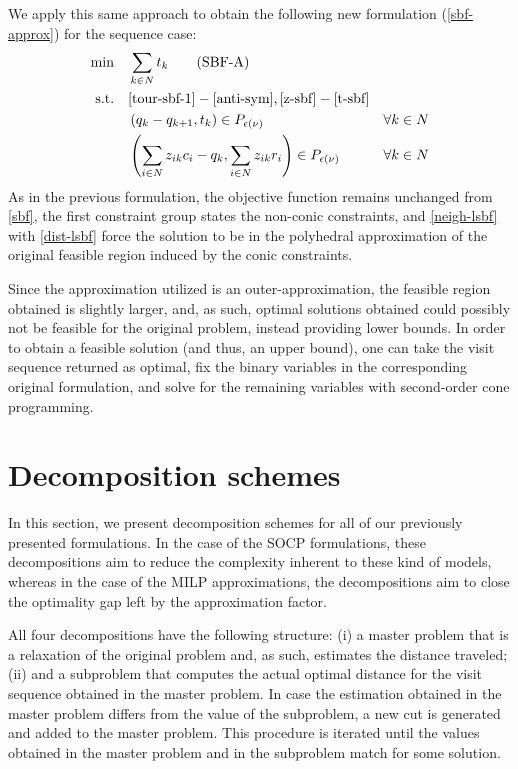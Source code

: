 \documentclass[pdflatex,sn-mathphys-num]{sn-jnl}%
\begin{document}
We apply this same approach to obtain the following new formulation (\ref{sbf-approx}) for the sequence case:
\begin{subequations}
\begin{align}
\min &&& \sum_{k \in N} t_k \tag{SBF-A} \label{sbf-approx}\\
\text{s.t.} &&& \eqref{tour-sbf-1}-\eqref{anti-sym}, \eqref{z-sbf}-\eqref{t-sbf}& \nonumber \\
&&& \left(q_k - q_{k+1}, t_k\right) \in P_{\epsilon(\nu)} & \forall k \in N \label{neigh-lsbf}\\
&&& \left(\sum_{i \in N} {z}_{ik}  c_i - q_k, \sum_{i\in N} {z}_{ik}  r_i\right) \in P_{\epsilon(\nu)} & \forall k \in N \label{dist-lsbf}
\end{align}
\end{subequations}
As in the previous formulation, the objective function remains unchanged from \ref{sbf}, the first constraint group states the non-conic constraints, and \eqref{neigh-lsbf} with \eqref{dist-lsbf} force the solution to be in the polyhedral approximation of the original feasible region induced by the conic constraints.

Since the approximation utilized is an outer-approximation, the feasible region obtained is slightly larger, and, as such, optimal solutions obtained could possibly not be feasible for the original problem, instead providing lower bounds. In order to obtain a feasible solution (and thus, an upper bound), one can take the visit sequence returned as optimal, fix the binary variables in the corresponding original formulation, and solve for the remaining variables with second-order cone programming.

\section{Decomposition schemes}\label{sec5}

In this section, we present decomposition schemes for all of our previously presented formulations. In the case of the SOCP formulations, these decompositions aim to reduce the complexity inherent to these kind of models, whereas in the case of the MILP approximations, the decompositions aim to close the optimality gap left by the approximation factor.

All four decompositions have the following structure: (i) a master problem that is a relaxation of the original problem and, as such, estimates the distance traveled; (ii) and a subproblem that computes the actual optimal distance for the visit sequence obtained in the master problem. In case the estimation obtained in the master problem differs from the value of the subproblem, a new cut is generated and added to the master problem. This procedure is iterated until the values obtained in the master problem and in the subproblem match for some solution.
\end{document}
